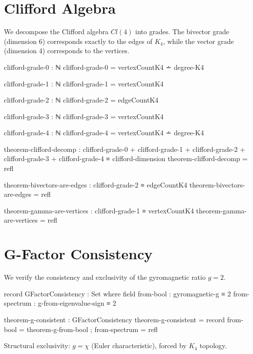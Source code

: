 \documentclass[11pt,a4paper]{book}
\begin{document}
\section{Clifford Algebra}

We decompose the Clifford algebra $Cl(4)$ into grades. The bivector grade (dimension 6) corresponds exactly to the edges of $K_4$, while the vector grade (dimension 4) corresponds to the vertices.

\begin{code}
clifford-grade-0 : ℕ
clifford-grade-0 = vertexCountK4 ∸ degree-K4

clifford-grade-1 : ℕ  
clifford-grade-1 = vertexCountK4

clifford-grade-2 : ℕ
clifford-grade-2 = edgeCountK4

clifford-grade-3 : ℕ
clifford-grade-3 = vertexCountK4

clifford-grade-4 : ℕ
clifford-grade-4 = vertexCountK4 ∸ degree-K4

theorem-clifford-decomp : clifford-grade-0 + clifford-grade-1 + clifford-grade-2 
                        + clifford-grade-3 + clifford-grade-4 ≡ clifford-dimension
theorem-clifford-decomp = refl

theorem-bivectors-are-edges : clifford-grade-2 ≡ edgeCountK4
theorem-bivectors-are-edges = refl

theorem-gamma-are-vertices : clifford-grade-1 ≡ vertexCountK4
theorem-gamma-are-vertices = refl
\end{code}

\section{G-Factor Consistency}

We verify the consistency and exclusivity of the gyromagnetic ratio $g=2$.

\begin{code}
record GFactorConsistency : Set where
  field
    from-bool        : gyromagnetic-g ≡ 2
    from-spectrum    : g-from-eigenvalue-sign ≡ 2

theorem-g-consistent : GFactorConsistency
theorem-g-consistent = record
  { from-bool = theorem-g-from-bool
  ; from-spectrum = refl
  }
\end{code}

Structural exclusivity: $g = \chi$ (Euler characteristic), forced by $K_4$ topology.
\end{document}
